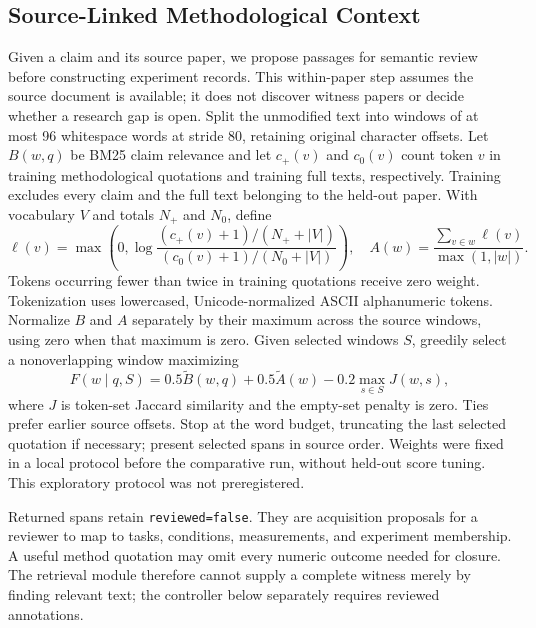 \documentclass[runningheads]{llncs}
\begin{document}
\subsection{Source-Linked Methodological Context}
Given a claim and its source paper, we propose passages for semantic review before constructing experiment records. This within-paper step assumes the source document is available; it does not discover witness papers or decide whether a research gap is open. Split the unmodified text into windows of at most 96 whitespace words at stride 80, retaining original character offsets. Let $B(w,q)$ be BM25 claim relevance and let $c_+(v)$ and $c_0(v)$ count token $v$ in training methodological quotations and training full texts, respectively. Training excludes every claim and the full text belonging to the held-out paper. With vocabulary $V$ and totals $N_+$ and $N_0$, define
\begin{equation}
 \ell(v)=\max\!\left(0,\log\frac{(c_+(v)+1)/(N_++|V|)}
 {(c_0(v)+1)/(N_0+|V|)}\right),\quad
 A(w)=\frac{\sum_{v\in w}\ell(v)}{\max(1,|w|)}.
\end{equation}
Tokens occurring fewer than twice in training quotations receive zero weight. Tokenization uses lowercased, Unicode-normalized ASCII alphanumeric tokens. Normalize $B$ and $A$ separately by their maximum across the source windows, using zero when that maximum is zero. Given selected windows $S$, greedily select a nonoverlapping window maximizing
\begin{equation}
 F(w\mid q,S)=0.5\widetilde B(w,q)+0.5\widetilde A(w)
 -0.2\max_{s\in S}J(w,s),
\label{eq:retrieval}
\end{equation}
where $J$ is token-set Jaccard similarity and the empty-set penalty is zero. Ties prefer earlier source offsets. Stop at the word budget, truncating the last selected quotation if necessary; present selected spans in source order. Weights were fixed in a local protocol before the comparative run, without held-out score tuning. This exploratory protocol was not preregistered.

Returned spans retain \texttt{reviewed=false}. They are acquisition proposals for a reviewer to map to tasks, conditions, measurements, and experiment membership. A useful method quotation may omit every numeric outcome needed for closure. The retrieval module therefore cannot supply a complete witness merely by finding relevant text; the controller below separately requires reviewed annotations.
\end{document}
